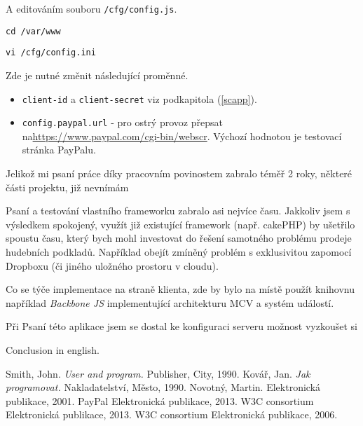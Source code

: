 \documentclass[12pt]{article}
\begin{document}
A editováním souboru \texttt{/cfg/config.js}.

\texttt{cd /var/www}

\texttt{vi /cfg/config.ini}\newline

Zde je nutné změnit následující proměnné.

\begin{itemize}
\item{\texttt{client-id} a \texttt{client-secret}} viz podkapitola (\ref{scapp}).
\item{\texttt{config.paypal.url}} - pro ostrý provoz přepsat na\newline \url{https://www.paypal.com/cgi-bin/webscr}. Výchozí hodnotou je testovací stránka PayPalu.
\end{itemize}

\begin{conclusions-cz}

Jelikož mi psaní práce díky pracovním povinostem zabralo téměř 2 roky, některé části projektu, již nevnímám 

Psaní a testování vlastního frameworku zabralo asi nejvíce času. Jakkoliv jsem s výsledkem spokojený, využít již existující framework (např. cakePHP) by ušetřilo spoustu času, který bych mohl investovat do řešení samotného problému prodeje hudebních podkladů. Například obejít zmíněný problém s exklusivitou zapomocí Dropboxu (či jiného uložného prostoru v cloudu).

Co se týče implementace na straně klienta, zde by bylo na místě použít knihovnu například \emph{Backbone JS} implementující architekturu MCV a systém událostí.

Při Psaní této aplikace jsem se dostal ke konfiguraci serveru 
možnost vyzkoušet si 

\end{conclusions-cz}

\begin{conclusions-en}
  Conclusion in english.
\end{conclusions-en}


\newpage
\begin{thebibliography}{99}

 Smith, John. \emph{User and program.}
                Publisher, City, 1990.
 Kovář, Jan. \emph{Jak programovat.}
                Nakladatelství, Město, 1990.
 Novotný, Martin.
                Elektronická publikace, 2001.
 PayPal
                Elektronická publikace, 2013.
 W3C consortium
                Elektronická publikace, 2013.
 W3C consortium
                Elektronická publikace, 2006.

\end{thebibliography}
\end{document}
